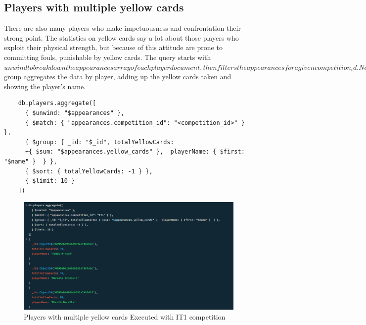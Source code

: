\documentclass{Configuration_Files/PoliMi3i_thesis}
\begin{document}
\subsection{Players with multiple yellow cards}
There are also many players who make impetuousness and confrontation their strong point. The statistics on yellow cards say a lot about those players who exploit their physical strength, but because of this attitude are prone to committing fouls, punishable by yellow cards. The query starts with $unwind to break down the appearances array of each player document, then filters the appearances for a given competition_id. Next, $group aggregates the data by player, adding up the yellow cards taken and showing the player's name. 
\begin{verbatim}
    db.players.aggregate([
      { $unwind: "$appearances" },
      { $match: { "appearances.competition_id": "<competition_id>" } },
      { $group: { _id: "$_id", totalYellowCards: 
      +{ $sum: "$appearances.yellow_cards" },  playerName: { $first: "$name" }  } },
      { $sort: { totalYellowCards: -1 } },
      { $limit: 10 }
    ])

\end{verbatim}

\begin{figure}[htbp]
    \centering
    \includegraphics[scale=0.9]{Images/Queries/Competitions_statistics/yellow-cards/IT1.png}
    \caption{Players with multiple yellow cards Executed with IT1 competition}
\end{figure}
\newpage
\end{document}
